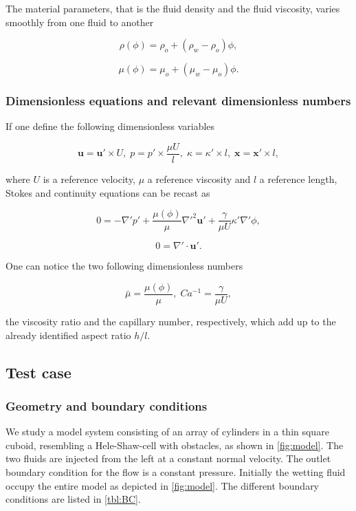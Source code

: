 \documentclass[]{article}
\begin{document}
The material parameters, that is the fluid density and the fluid
viscosity, varies smoothly from one fluid to another

\[
\rho(\phi)=\rho_{o}+(\rho_{w}-\rho_{o})\phi,
\]

\[
\mu(\phi)=\mu_{o}+(\mu_{w}-\mu_{o})\phi.
\]

\hypertarget{dimensionless-equations-and-relevant-dimensionless-numbers}{%
\subsubsection{Dimensionless equations and relevant dimensionless
numbers}\label{dimensionless-equations-and-relevant-dimensionless-numbers}}

If one define the following dimensionless variables

\[
\mathbf{u}=\mathbf{u}'\times U,\;p=p'\times\frac{\mu U}{l},\;\kappa=\kappa'\times l,\;\mathbf{x}=\mathbf{x}'\times l,
\]

where \(U\) is a reference velocity, \(\mu\) a reference viscosity and
\(l\) a reference length, Stokes and continuity equations can be recast
as

\[
0=-\nabla'p'+\frac{\mu(\phi)}{\mu}\nabla'^{2}\mathbf{u}'+\frac{\gamma}{\mu U}\kappa'\nabla'\phi,
\]

\[
0=\nabla'\cdot\mathbf{u}'.
\]

One can notice the two following dimensionless numbers

\[
\bar{\mu}=\frac{\mu(\phi)}{\mu},\;Ca^{-1}=\frac{\gamma}{\mu U},
\]

the viscosity ratio and the capillary number, respectively, which add up
to the already identified aspect ratio \(h/l\).

\hypertarget{test-case}{%
\subsection{Test case}\label{test-case}}

\hypertarget{geometry-and-boundary-conditions}{%
\subsubsection{Geometry and boundary
conditions}\label{geometry-and-boundary-conditions}}

We study a model system consisting of an array of cylinders in a thin
square cuboid, resembling a Hele-Shaw-cell with obstacles, as shown in
\cref{fig:model}. The two fluids are injected from the left at a
constant normal velocity. The outlet boundary condition for the flow is
a constant pressure. Initially the wetting fluid occupy the entire model
as depicted in \cref{fig:model}. The different boundary conditions are
listed in \cref{tbl:BC}.
\end{document}
